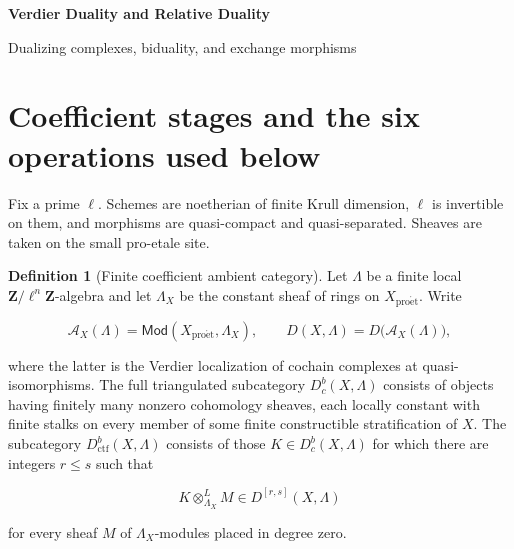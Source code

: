 \documentclass[10pt]{article}
\theoremstyle{definition}
\newtheorem{definition}[theorem]{Definition}
\newcommand{\Dbc}{D^b_c}
\newcommand{\Dctf}{D^b_{\mathrm{ctf}}}
\begin{document}
\begin{center}
{\large\bfseries Verdier Duality and Relative Duality\par}
\medskip
{\normalsize Dualizing complexes, biduality, and exchange morphisms\par}
\end{center}

\begin{abstract}
This note constructs Verdier duality from the derived internal Hom and the
exceptional inverse image of a base dualizing object.  Constructibility,
biduality, open and proper exchanges, smooth purity, relative duality,
pairings, and coefficient-change rectangles are stated as a sequence of
separate results.  All source and target categories are explicit.
\end{abstract}

\tableofcontents

\section{Coefficient stages and the six operations used below}

Fix a prime \(\ell\).  Schemes are noetherian of finite Krull dimension,
\(\ell\) is invertible on them, and morphisms are quasi-compact and
quasi-separated.  Sheaves are taken on the small pro-etale site.

\begin{definition}[Finite coefficient ambient category]
Let \(\Lambda\) be a finite local
\(\mathbf Z/\ell^n\mathbf Z\)-algebra and let \(\Lambda_X\) be the constant
sheaf of rings on \(X_{\mathrm{pro\acute et}}\).  Write

\[
 \mathcal A_X(\Lambda)
 =\mathsf{Mod}(X_{\mathrm{pro\acute et}},\Lambda_X),
 \qquad
 D(X,\Lambda)=D\bigl(\mathcal A_X(\Lambda)\bigr),
\]

where the latter is the Verdier localization of cochain complexes at
quasi-isomorphisms.  The full triangulated subcategory
\(\Dbc(X,\Lambda)\) consists of objects having finitely many nonzero
cohomology sheaves, each locally constant with finite stalks on every member
of some finite constructible stratification of \(X\).  The subcategory
\(\Dctf(X,\Lambda)\) consists of those \(K\in\Dbc(X,\Lambda)\) for which
there are integers \(r\leq s\) such that

\[
 K\otimes^L_{\Lambda_X}M\in D^{[r,s]}(X,\Lambda)
\]

for every sheaf \(M\) of \(\Lambda_X\)-modules placed in degree zero.
\end{definition}
\end{document}
